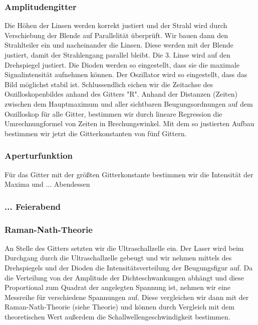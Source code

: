 \subsubsection{Amplitudengitter}

Die H\"ohen der Linsen werden korrekt justiert und der Strahl wird durch Verschiebung der Blende auf Parallelit\"at \"uberpr\"uft. Wir bauen dann den Strahlteiler ein und nacheinander die Linsen. Diese werden mit der Blende justiert, damit der Strahlengang parallel bleibt. Die 3. Linse wird auf den Drehspiegel justiert. Die Dioden werden so eingestellt, dass sie die maximale Signalintensit\"at aufnehmen k\"onnen. Der Oszillator wird so eingestellt, dass das Bild m\"oglichst stabil ist. Schlussendlich eichen wir die Zeitachse des Oszilloskopenbildes anhand des Gitters "R". Anhand der Distanzen (Zeiten) zwischen dem Hauptmaximum und aller sichtbaren Beugungsordnungen auf dem Oszilloskop f\"ur alle Gitter, bestimmen wir durch lineare Regression die Umrechnungformel von Zeiten in Brechungswinkel.
Mit dem so justierten Aufbau bestimmen wir jetzt die Gitterkonstanten von fünf Gittern.

\subsubsection{Aperturfunktion}
Für das Gitter mit der größten Gitterkonstante bestimmen wir die Intensität der Maxima und ... Abendessen

\subsubsection{... Feierabend }
\subsubsection{Raman-Nath-Theorie}

An Stelle des Gitters setzten wir die Ultraschallzelle ein. Der Laser wird beim Durchgang durch die Ultraschallzelle gebeugt und wir nehmen mittels des Drehspiegels und der Dioden die Intensitätsverteilung der Beugungsfigur auf. Da die Verteilung von der Amplitude der Dichteschwankungen abhängt und diese Proportional zum Quadrat der angelegten Spannung ist, nehmen wir eine Messreihe für verschiedene Spannungen auf. Diese vergleichen wir dann mit der Raman-Nath-Theorie (siehe Theorie) und können durch Vergleich mit dem theoretischen Wert außerdem die Schallwellengeschwindigkeit bestimmen.

\clearpage